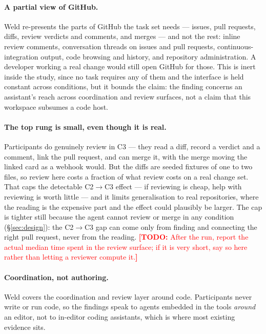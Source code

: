 \documentclass[acmsmall,review,screen]{acmart}
\newcommand{\todo}[1]{\textcolor{red}{\textbf{[TODO:} #1\textbf{]}}}
\begin{document}
\paragraph{A partial view of GitHub.} Weld re-presents the parts of GitHub the
task set needs --- issues, pull requests, diffs, review verdicts and comments,
and merges --- and not the rest: inline review comments, conversation threads on
issues and pull requests, continuous-integration output, code browsing and
history, and repository administration. A developer working a real change would
still open GitHub for those. This is inert inside the study, since no task
requires any of them and the interface is held constant across conditions, but it
bounds the claim: the finding concerns an assistant's reach across coordination
and review surfaces, not a claim that this workspace subsumes a code host.

\paragraph{The top rung is small, even though it is real.} Participants do
genuinely review in C3 --- they read a diff, record a verdict and a comment,
link the pull request, and can merge it, with the merge moving the linked card
as a webhook would. But the diffs are seeded fixtures of one to two files, so
review here costs a fraction of what review costs on a real change set. That
caps the detectable C2$\rightarrow$C3 effect --- if reviewing is cheap, help
with reviewing is worth little --- and it limits generalisation to real
repositories, where the reading is the expensive part and the effect could
plausibly be larger. The cap is tighter still because the agent cannot review or
merge in any condition (\S\ref{sec:design}): the C2$\rightarrow$C3 gap can come
only from finding and connecting the right pull request, never from the reading. \todo{After the run, report the actual median time spent in
the review surface; if it is very short, say so here rather than letting a
reviewer compute it.}

\paragraph{Coordination, not authoring.} Weld covers the coordination and review
layer around code. Participants never write or run code, so the findings speak to
agents embedded in the tools \emph{around} an editor, not to in-editor coding
assistants, which is where most existing evidence sits.
\end{document}
